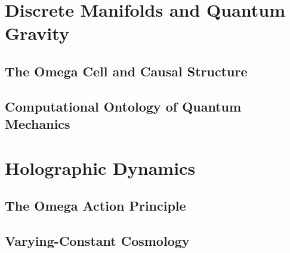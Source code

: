 \documentclass[11pt,a4paper,twoside]{book}
\begin{document}
\part{Discrete Manifolds and Quantum Gravity}

\chapter{The Omega Cell and Causal Structure}




\chapter{Computational Ontology of Quantum Mechanics}




\part{Holographic Dynamics}

\chapter{The Omega Action Principle}






\chapter{Varying-Constant Cosmology}



\end{document}

